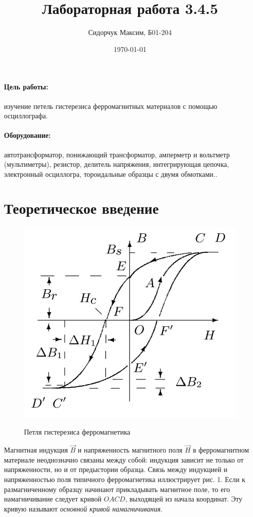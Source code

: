 \documentclass[a4paper]{article}
\date{\today}
\title{Лабораторная работа 3.4.5}
\author{Сидорчук Максим, Б01-204}
\begin{document}
\maketitle
\paragraph*{Цель работы:} изучение петель гистерезиса ферромагнитных материалов с помощью осциллографа.

\paragraph*{Оборудование:} автотрансформатор, понижающий трансформатор, амперметр и вольтметр (мультиметры), резистор, делитель напряжения, интегрирующая
цепочка, электронный осциллогра, тороидальные образцы с двумя обмотками..

\section{Теоретическое введение}

\begin{figure}
	\vspace{-20pt}
	\begin{center}
		\includegraphics[width=0.7\linewidth]{gist3.jpg}
		\label{fig:sdfsafd}
	\end{center}
	\vspace{-10pt}
	\caption{Петля гистерезиса ферромагнетика}
\end{figure}

Магнитная индукция $\vec{B}$ и напряженность магнитного поля
$\vec{H}$ в ферромагнитном материале неоднозначно связаны
между собой: индукция зависит не только от напряженности, но
и от предыстории образца. Связь между индукцией
и напряженностью поля типичного ферромагнетика иллюстрирует рис. 1. Если
к размагниченному образцу начинают прикладывать магнитное поле, то его намагничивание следует кривой $ OACD $, выходящей
из начала
координат. Эту кривую называют \textit{основной кривой намагничивания}.
\end{document}
